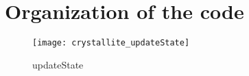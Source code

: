 \chapter{Organization of the code}


\begin{figure}
\centering
\texttt{[image: crystallite\_updateState]}
\caption{updateState}
\label{fig:crystallite_updateState}
\end{figure}

